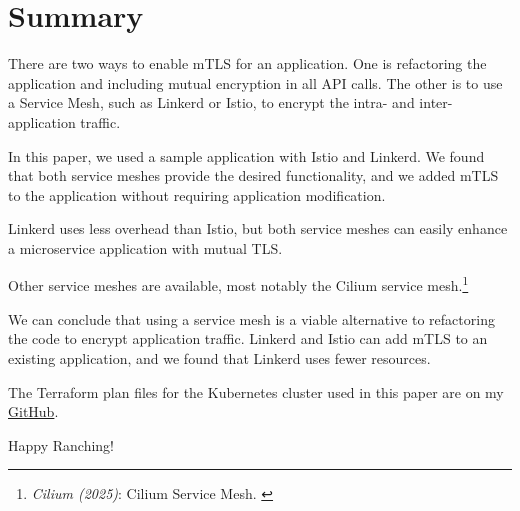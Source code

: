 %
%

\pagebreak
\section{Summary}

\onehalfspacing

There are two ways to enable mTLS for an application. One is refactoring the application and including mutual encryption in all API calls. The other is to use a Service Mesh, such as Linkerd or Istio, to encrypt the intra- and inter-application traffic.

In this paper, we used a sample application with Istio and Linkerd. We found that both service meshes provide the desired functionality, and we added mTLS to the application without requiring application modification.

Linkerd uses less overhead than Istio, but both service meshes can easily enhance a microservice application with mutual TLS. 

Other service meshes are available, most notably the Cilium service mesh.\footnote{\textit{Cilium (2025)}: Cilium Service Mesh. \cite{ciliumMesh}}

We can conclude that using a service mesh is a viable alternative to refactoring the code to encrypt application traffic. Linkerd and Istio can add mTLS to an existing application, and we found that Linkerd uses fewer resources.

The Terraform plan files for the Kubernetes cluster used in this paper are on my \href{https://github.com/chfrank-cgn/Rancher/tree/master/aks-cluster}{GitHub}.

Happy Ranching!
